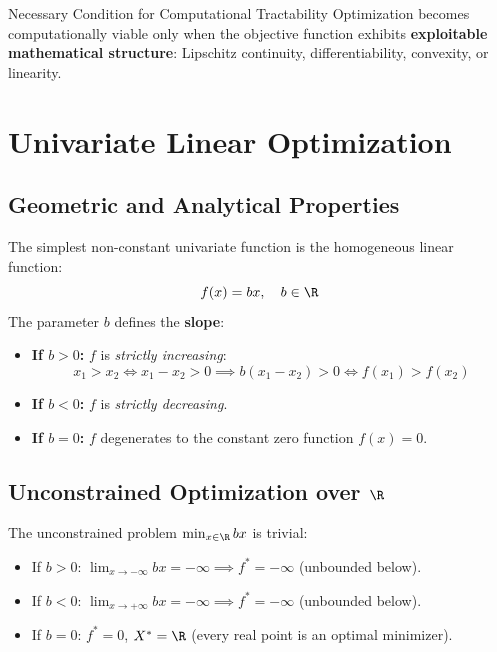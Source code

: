 \begin{noteblock}{Necessary Condition for Computational Tractability}
Optimization becomes computationally viable only when the objective function exhibits \textbf{exploitable mathematical structure}: Lipschitz continuity, differentiability, convexity, or linearity.
\end{noteblock}


\FloatBarrier
\section{Univariate Linear Optimization}
\label{sec:opt-linear-case}

\subsection{Geometric and Analytical Properties}
The simplest non-constant univariate function is the homogeneous linear function:
\begin{equation}
f(x) = bx, \quad b \in \R
\end{equation}
The parameter $b$ defines the \textbf{slope}:
\begin{itemize}
    \item \textbf{If $b > 0$:} $f$ is \textit{strictly increasing}:
    \begin{equation}
    x_1 > x_2 \iff x_1 - x_2 > 0 \implies b(x_1 - x_2) > 0 \iff f(x_1) > f(x_2)
    \end{equation}
    \item \textbf{If $b < 0$:} $f$ is \textit{strictly decreasing}.
    \item \textbf{If $b = 0$:} $f$ degenerates to the constant zero function $f(x) = 0$.
\end{itemize}

\subsection[Unconstrained Optimization on R]{Unconstrained Optimization over $\R$}
The unconstrained problem $\min_{x \in \R} bx$ is trivial:
\begin{itemize}
    \item If $b > 0$: $\lim_{x \to -\infty} bx = -\infty \implies f^* = -\infty$ (unbounded below).
    \item If $b < 0$: $\lim_{x \to +\infty} bx = -\infty \implies f^* = -\infty$ (unbounded below).
    \item If $b = 0$: $f^* = 0$, $X^* = \R$ (every real point is an optimal minimizer).
\end{itemize}

